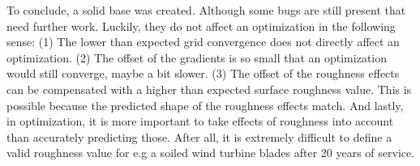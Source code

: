 To conclude, a solid base was created. Although some bugs are still present that
need further work. Luckily, they do not affect an optimization in the following
sense: (1) The lower than expected grid convergence does not directly affect an
optimization. (2) The offset of the gradients is so small that an optimization
would still converge, maybe a bit slower. (3) The offset of the roughness
effects can be compensated with a higher than expected surface roughness value.
This is possible because the predicted shape of the roughness effects match.
And lastly, in optimization, it is more important to take effects of roughness
into account than accurately predicting those. After all, it is extremely
difficult to define a valid roughness value for e.g a soiled wind turbine blades
after 20 years of service.
